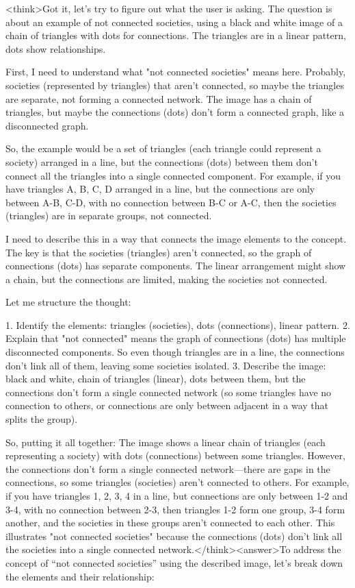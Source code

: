 <think>Got it, let's try to figure out what the user is asking. The question is about an example of not connected societies, using a black and white image of a chain of triangles with dots for connections. The triangles are in a linear pattern, dots show relationships. 

First, I need to understand what "not connected societies" means here. Probably, societies (represented by triangles) that aren't connected, so maybe the triangles are separate, not forming a connected network. The image has a chain of triangles, but maybe the connections (dots) don't form a connected graph, like a disconnected graph. 

So, the example would be a set of triangles (each triangle could represent a society) arranged in a line, but the connections (dots) between them don't connect all the triangles into a single connected component. For example, if you have triangles A, B, C, D arranged in a line, but the connections are only between A-B, C-D, with no connection between B-C or A-C, then the societies (triangles) are in separate groups, not connected. 

I need to describe this in a way that connects the image elements to the concept. The key is that the societies (triangles) aren't connected, so the graph of connections (dots) has separate components. The linear arrangement might show a chain, but the connections are limited, making the societies not connected. 

Let me structure the thought:

1. Identify the elements: triangles (societies), dots (connections), linear pattern.
2. Explain that "not connected" means the graph of connections (dots) has multiple disconnected components. So even though triangles are in a line, the connections don't link all of them, leaving some societies isolated.
3. Describe the image: black and white, chain of triangles (linear), dots between them, but the connections don't form a single connected network (so some triangles have no connection to others, or connections are only between adjacent in a way that splits the group).

So, putting it all together: The image shows a linear chain of triangles (each representing a society) with dots (connections) between some triangles. However, the connections don't form a single connected network—there are gaps in the connections, so some triangles (societies) aren't connected to others. For example, if you have triangles 1, 2, 3, 4 in a line, but connections are only between 1-2 and 3-4, with no connection between 2-3, then triangles 1-2 form one group, 3-4 form another, and the societies in these groups aren't connected to each other. This illustrates "not connected societies" because the connections (dots) don't link all the societies into a single connected network.</think><answer>To address the concept of “not connected societies” using the described image, let’s break down the elements and their relationship:  

